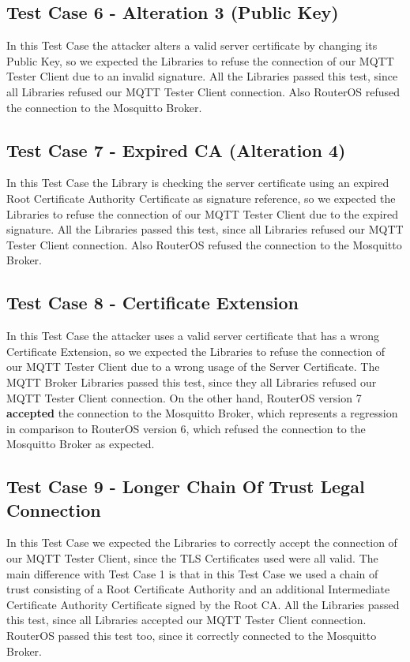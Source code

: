 \documentclass[binding=0.6cm,noexaminfo]{sapthesis}
\begin{document}
\subsection{Test Case 6 - Alteration 3 (Public Key)}
In this Test Case the attacker alters a valid server certificate by changing its Public Key, so we expected the Libraries to refuse the connection of our MQTT Tester Client due to an invalid signature. All the Libraries passed this test, since all Libraries refused our MQTT Tester Client connection.
Also RouterOS refused the connection to the Mosquitto Broker.

\subsection{Test Case 7 - Expired CA (Alteration 4)}
In this Test Case the Library is checking the server certificate using an expired Root Certificate Authority Certificate as signature reference, so we expected the Libraries to refuse the connection of our MQTT Tester Client due to the expired signature. All the Libraries passed this test, since all Libraries refused our MQTT Tester Client connection.
Also RouterOS refused the connection to the Mosquitto Broker.

\subsection{Test Case 8 - Certificate Extension}
In this Test Case the attacker uses a valid server certificate that has a wrong Certificate Extension, so we expected the Libraries to refuse the connection of our MQTT Tester Client due to a wrong usage of the Server Certificate. The MQTT Broker Libraries passed this test, since they all Libraries refused our MQTT Tester Client connection.
On the other hand, RouterOS version 7 \textbf{accepted} the connection to the Mosquitto Broker, which represents a regression in comparison to RouterOS version 6, which refused the connection to the Mosquitto Broker as expected.

\subsection{Test Case 9 - Longer Chain Of Trust Legal Connection}
In this Test Case we expected the Libraries to correctly accept the connection of our MQTT Tester Client, since the TLS Certificates used were all valid. The main difference with Test Case 1 is that in this Test Case we used a chain of trust consisting of a Root Certificate Authority and an additional Intermediate Certificate Authority Certificate signed by the Root CA. All the Libraries passed this test, since all Libraries accepted our MQTT Tester Client connection.
RouterOS passed this test too, since it correctly connected to the Mosquitto Broker.
\end{document}
